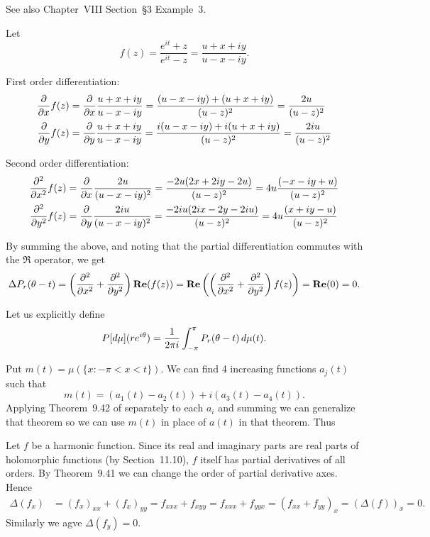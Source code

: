 \begin{enumerate}
See also \cite{Lang199304} Chapter~\textsf{VIII} Section~\S3 Example~3.

Let
\begin{equation*}
f(z) = \frac{e^{it} + z}{e^{it} - z} = \frac{u + x+iy}{u - x - iy}.
\end{equation*}

First order differentiation:
\begin{align*}
\frac{\partial}{\partial x}f(z) 
&= \frac{\partial}{\partial x} \frac{u + x+iy}{u - x - iy}
 = \frac{(u - x - iy) + (u + x+iy)}{(u-z)^2}
 = \frac{2u}{(u-z)^2}
 \\
\frac{\partial}{\partial y}f(z) 
&= \frac{\partial}{\partial y} \frac{u + x+iy}{u - x - iy}
 = \frac{i(u - x - iy) + i(u + x+iy)}{(u-z)^2}
 = \frac{2iu}{(u-z)^2}
\end{align*}

Second order differentiation:
\begin{align*}
\frac{\partial^2 }{\partial x^2}f(z) 
 &= \frac{\partial}{\partial x}\frac{2u}{(u-x-iy)^2}
  = \frac{-2u(2x+2iy-2u)}{(u-z)^2}
  = 4u\frac{(-x-iy+u)}{(u-z)^2}
 \\
\frac{\partial^2 }{\partial y^2}f(z) 
 &= \frac{\partial}{\partial y}\frac{2iu}{(u-x-iy)^2}
  = \frac{-2iu(2ix-2y-2iu)}{(u-z)^2}
  = 4u\frac{(x+iy-u)}{(u-z)^2}
\end{align*}

By summing the above, and noting that the partial differentiation
commutes with the \(\Re\) operator,
we get 
\begin{align*}
\Delta P_r(\theta - t)
= \left(\frac{\partial^2 }{\partial x^2}+\frac{\partial^2 }{\partial y^2}\right) \mathop{\bf Re}\nolimits(f(z))
= \mathop{\bf Re}\nolimits\left(\left(\frac{\partial^2 }{\partial x^2}+\frac{\partial^2 }{\partial y^2}\right) f(z)\right)
= \mathop{\bf Re}\nolimits(0) = 0.
\end{align*}

Let us explicitly define 
\begin{equation*}
P[d\mu](re^{i\theta}) = \frac{1}{2\pi i} \int_{-\pi}^\pi P_r(\theta - t)\,d\mu(t).
\end{equation*}

Put \(m(t) = \mu(\{x: -\pi < x < t\})\).
We can find 4 increasing functions \(a_j(t)\) such that
\begin{equation*}
m(t) = (a_1(t) - a_2(t)) + i\left(a_3(t) - a_4(t)\right).
\end{equation*}
Applying Theorem~9.42 of \cite{RudinPMA85} separately to each \(a_i\)
and summing we can generalize that theorem so we can use \(m(t)\)
in place of \(a(t)\) in that theorem.
Thus

\iffalse
Let $f$ be a harmonic function.
Since its real and imaginary parts are real parts of holomorphic functions
(by Section~11.10), $f$ itself has partial derivatives of all orders.
By Theorem~9.41 \cite{RudinPMA85} we can change the order
of partial derivative axes. Hence
\begin{align*}
\Delta(f_x)
&= (f_x)_{xx} + (f_x)_{yy}
 = f_{xxx} + f_{xyy}
 = f_{xxx} + f_{yyx}
 = \left(f_{xx} + f_{yy}\right)_x
 = \left(\Delta(f)\right)_x
 = 0.
\end{align*}
Similarly we agve \(\Delta(f_y) = 0\).


\end{enumerate}
